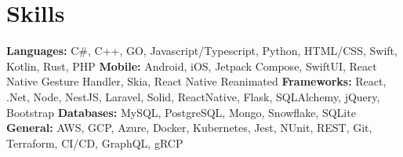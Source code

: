 
\vspace{5 pt - 0.4 cm}
\section{Skills}
\begin{onecolentry}
    \textbf{Languages:} C\#, C++, GO, Javascript/Typescript, Python, HTML/CSS, Swift, Kotlin, Rust, PHP  \newline
    \textbf{Mobile:} Android, iOS, Jetpack Compose, SwiftUI, React Native Gesture Handler, Skia, React Native Reanimated \newline
    \textbf{Frameworks:} React, .Net, Node, NestJS, Laravel, Solid, ReactNative, Flask, SQLAlchemy, jQuery, Bootstrap  \newline
    \textbf{Databases:} MySQL, PostgreSQL, Mongo, Snowflake, SQLite \newline
    \textbf{General:} AWS, GCP, Azure, Docker, Kubernetes, Jest, NUnit, REST, Git, Terraform, CI/CD, GraphQL, gRCP  \newline
\end{onecolentry}
